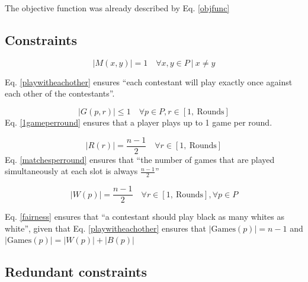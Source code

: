 \documentclass[a4paper, 10pt]{article}
\begin{document}
The objective function was already described by Eq. \ref{objfunc}

\subsection{Constraints}

\begin{equation}
    \label{playwitheachother}
    |M(x,y)| = 1 \quad \forall x,y \in P \ | \  x \neq y
\end{equation}

Eq. \ref{playwitheachother} ensures ``each contestant will play exactly once against each other of the contestants''.


\begin{equation}
    \label{1gameperround}
    |G(p,r)| \leq 1 \quad \forall p \in P, r \in [1, \ \text{Rounds}] 
\end{equation}
Eq. \ref{1gameperround} ensures that a player plays up to 1 game per round.

\begin{equation}
    \label{matchesperround}
    |R(r)| = \frac{n-1}{2}  \quad \forall r \in [1,\ \text{Rounds}] 
\end{equation}
Eq. \ref{matchesperround} ensures that ``the number of games that are played simultaneously at each slot is always $\frac{n-1}{2}$''

\begin{equation}
    \label{fairness}
    |W(p)| = \frac{n-1}{2} \quad \forall r \in [1, \ \text{Rounds}], \forall p \in P
\end{equation}

Eq. \ref{fairness} ensures that ``a contestant should play black as many whites as white'', 
given that Eq. \ref{playwitheachother} ensures that $|\text{Games}(p)| = n - 1$ and $|\text{Games}(p)| = |W(p)| + |B(p)|$  

\subsection{Redundant constraints}
\label{subsec:redundant}
\end{document}
